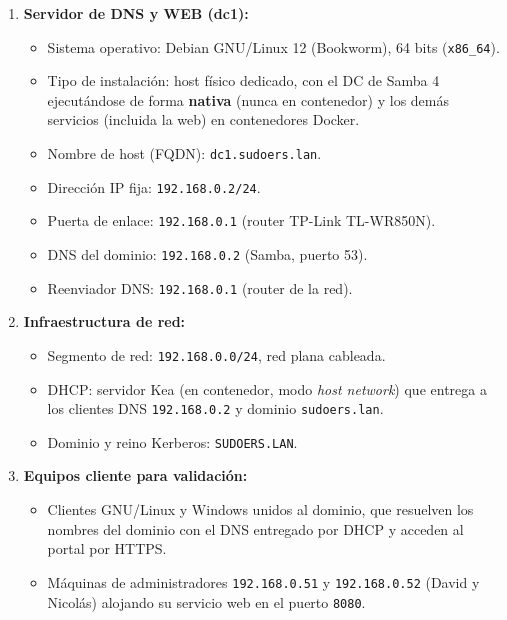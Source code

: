 \begin{enumerate}[label=\alph*)]
  \item \textbf{Servidor de DNS y WEB (dc1):}
  \begin{itemize}
    \item Sistema operativo: Debian GNU/Linux 12 (Bookworm), 64 bits
          (\texttt{x86\_64}).
    \item Tipo de instalaci\'on: host f\'isico dedicado, con el DC de Samba 4
          ejecut\'andose de forma \textbf{nativa} (nunca en contenedor) y los
          dem\'as servicios (incluida la web) en contenedores Docker.
    \item Nombre de host (FQDN): \texttt{dc1.sudoers.lan}.
    \item Direcci\'on IP fija: \texttt{192.168.0.2/24}.
    \item Puerta de enlace: \texttt{192.168.0.1} (router TP-Link TL-WR850N).
    \item DNS del dominio: \texttt{192.168.0.2} (Samba, puerto 53).
    \item Reenviador DNS: \texttt{192.168.0.1} (router de la red).
  \end{itemize}

  \item \textbf{Infraestructura de red:}
  \begin{itemize}
    \item Segmento de red: \texttt{192.168.0.0/24}, red plana cableada.
    \item DHCP: servidor Kea (en contenedor, modo \textit{host network}) que
          entrega a los clientes DNS \texttt{192.168.0.2} y dominio
          \texttt{sudoers.lan}.
    \item Dominio y reino Kerberos: \texttt{SUDOERS.LAN}.
  \end{itemize}

  \item \textbf{Equipos cliente para validaci\'on:}
  \begin{itemize}
    \item Clientes GNU/Linux y Windows unidos al dominio, que resuelven los
          nombres del dominio con el DNS entregado por DHCP y acceden al
          portal por HTTPS.
    \item M\'aquinas de administradores \texttt{192.168.0.51} y
          \texttt{192.168.0.52} (David y Nicol\'as) alojando su servicio web
          en el puerto \texttt{8080}.
  \end{itemize}
\end{enumerate}

